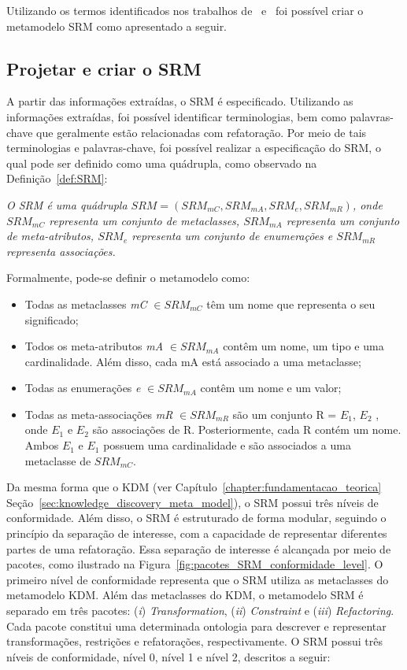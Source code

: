Utilizando os termos identificados nos trabalhos de~ e~ foi possível criar o metamodelo SRM como apresentado a seguir. 

\subsection{Projetar e criar o SRM}

A partir das informações extraídas, o SRM é especificado. Utilizando as informações extraídas, foi possível identificar terminologias, bem como palavras-chave que geralmente estão relacionadas com refatoração. Por meio de tais terminologias e palavras-chave, foi possível realizar a especificação do SRM, o qual pode ser definido como uma quádrupla, como observado na Definição~\ref{def:SRM}: 

\begin{definicao}\label{def:SRM}
    \textit{O SRM é uma quádrupla $SRM = (SRM_{mC}, SRM_{mA}, SRM_{e}, SRM_{mR})$, onde $SRM_{mC} $ representa um conjunto de metaclasses, $SRM_{mA}$ representa um conjunto de meta-atributos, $SRM_{e}$ representa um conjunto de enumerações e $SRM_{mR}$ representa associações.}
\end{definicao}

Formalmente, pode-se definir o metamodelo como:

\begin{itemize}
	\item Todas as metaclasses \textit{mC} $\in SRM_{mC}$ têm um nome que representa o seu significado;
	\item Todos os meta-atributos \textit{mA} $\in SRM_{mA}$ contêm um nome, um tipo e uma cardinalidade. Além disso, cada mA está associado a uma metaclasse;
	\item Todas as enumerações \textit{e} $\in SRM_{mA}$ contêm um nome e um valor;
	\item Todas as meta-associações \textit{mR} $\in SRM_{mR}$ são um conjunto R = $E_{1}$, $E_{2}$  , onde  $E_{1}$ e $E_{2}$ são associações de R. Posteriormente, cada R contém um nome. Ambos $E_{1}$  e $E_{1}$ possuem uma cardinalidade e são associados a uma metaclasse de $SRM_{mC}$.
\end{itemize}

Da mesma forma que o KDM (ver Capítulo~\ref{chapter:fundamentacao_teorica} Seção~\ref{sec:knowledge_discovery_meta_model}), o SRM possui três níveis de conformidade. Além disso, o SRM é estruturado de forma modular, seguindo o princípio da separação de interesse, com a capacidade de representar diferentes partes de uma refatoração. Essa separação de interesse é alcançada por meio de pacotes, como ilustrado na Figura~\ref{fig:pacotes_SRM_conformidade_level}. O primeiro nível de conformidade representa que o SRM utiliza as metaclasses do metamodelo KDM. Além das metaclasses do KDM, o metamodelo SRM é separado em três pacotes: (\textit{i}) \textit{Transformation}, (\textit{ii}) \textit{Constraint} e (\textit{iii}) \textit{Refactoring}. Cada pacote constitui uma determinada ontologia para descrever e representar transformações, restrições e refatorações, respectivamente. O SRM possui três níveis de conformidade, nível 0, nível 1 e nível 2, descritos a seguir:

